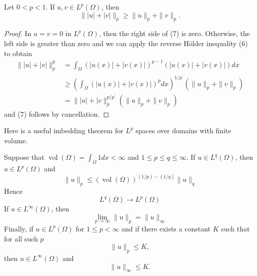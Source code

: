 \begin{theorem}
  Let $0<p<1$. If $u, v \in L^p(\Omega)$, then
  \begin{equation}\label{eq:2.7}
    \||u|+|v|\|_p \geq\|u\|_p+\|v\|_p .
  \end{equation}
\end{theorem}

\begin{proof}
  In $u=v=0$ in $L^p(\Omega)$, then the right side of (7) is zero. Otherwise, the left side is greater than zero and we can apply the reverse Hölder inequality (6) to obtain
  \[
  \begin{aligned}
  \||u|+|v|\|_p^p & =\int_{\Omega}(|u(x)|+|v(x)|)^{p-1}(|u(x)|+|v(x)|) d x \\
  & \geq\left(\int_{\Omega}(|u(x)|+|v(x)|)^p d x\right)^{1 / p^{\prime}}\left(\|u\|_p+\|v\|_p\right) \\
  & =\||u|+\mid v\|_p^{p / p^{\prime}}\left(\|u\|_p+\|v\|_p\right)
  \end{aligned}
  \]
  and (7) follows by cancellation.
\end{proof}

Here is a useful imbedding theorem for $L^p$ spaces over domains with finite volume.

\begin{theorem}
  Suppose that $\operatorname{vol}(\Omega)=\int_{\Omega} 1 d x<\infty$ and $1 \leq p \leq q \leq \infty$. If $u \in L^q(\Omega)$, then $u \in L^p(\Omega)$ and
  \begin{equation}\label{eq:2.8}
    \|u\|_p \leq(\operatorname{vol}(\Omega))^{(1 / p)-(1 / q)}\|u\|_q
  \end{equation}
  Hence
  \begin{equation}\label{eq:2.9}
    L^q(\Omega) \rightarrow L^p(\Omega)
  \end{equation}
  If $u \in L^{\infty}(\Omega)$, then
  \begin{equation}\label{eq:2.10}
    \lim _{p \rightarrow \infty}\|u\|_p=\|u\|_{\infty}
  \end{equation}
  Finally, if $u \in L^p(\Omega)$ for $1 \leq p<\infty$ and if there exists a constant $K$ such that for all such $p$
  \begin{equation}\label{eq:2.11}
    \|u\|_p \leq K,
  \end{equation}
  then $u\in L^\infty(\Omega)$ and
  \begin{equation}\label{eq:2.12}
    \|u\|_\infty \leq K.
  \end{equation}
\end{theorem}

